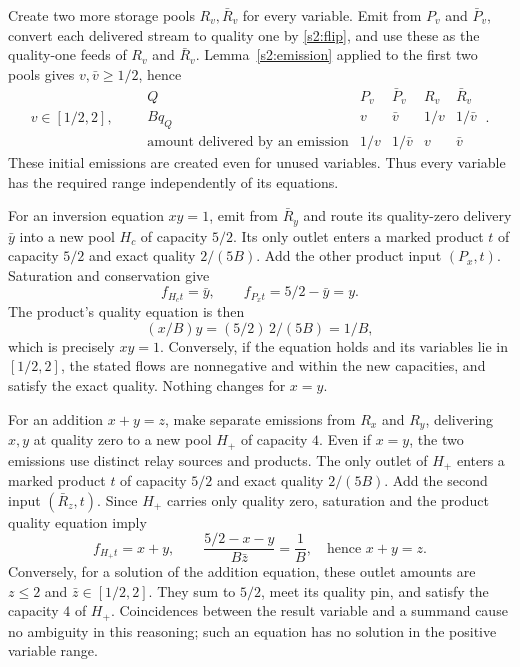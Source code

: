 Create two more storage pools $R_v,\bar R_v$ for every variable.
Emit from $P_v$ and $\bar P_v$, convert each delivered stream to quality
one by \eqref{s2:flip}, and use these as the quality-one feeds of
$R_v$ and $\bar R_v$. Lemma~\ref{s2:emission} applied to the first
two pools gives $v,\bar v\ge1/2$, hence
\begin{equation}
 v\in[1/2,2],\qquad
 \begin{array}{c|cccc}
 Q&P_v&\bar P_v&R_v&\bar R_v\\ \hline
 Bq_Q&v&\bar v&1/v&1/\bar v\\
 \text{amount delivered by an emission}&1/v&1/\bar v&v&\bar v
 \end{array}\ .\label{s2:four-pools}
\end{equation}
These initial emissions are created even for unused variables. Thus
every variable has the required range independently of its equations.

For an inversion equation $xy=1$, emit from $\bar R_y$ and route its
quality-zero delivery $\bar y$ into a new pool $H_c$ of capacity $5/2$.
Its only outlet enters a marked product $t$ of capacity $5/2$ and exact
quality $2/(5B)$. Add the other product input $(P_x,t)$. Saturation
and conservation give
\[
 f_{H_ct}=\bar y,\qquad f_{P_xt}=5/2-\bar y=y.
\]
The product's quality equation is then
\begin{equation}
 (x/B)y=(5/2)\,2/(5B)=1/B,\label{s2:inversion}
\end{equation}
which is precisely $xy=1$. Conversely, if the equation holds and its
variables lie in $[1/2,2]$, the stated flows are nonnegative and within
the new capacities, and satisfy the exact quality. Nothing changes for
$x=y$.

For an addition $x+y=z$, make separate emissions from $R_x$ and $R_y$,
delivering $x,y$ at quality zero to a new pool $H_+$ of capacity $4$.
Even if $x=y$, the two emissions use distinct relay sources and products.
The only outlet of $H_+$ enters a marked product $t$ of capacity $5/2$
and exact quality $2/(5B)$. Add the second input $(\bar R_z,t)$.
Since $H_+$ carries only quality zero, saturation and the product
quality equation imply
\begin{equation}
 f_{H_+t}=x+y,\qquad
 \frac{5/2-x-y}{B\bar z}=\frac1B,
 \quad\text{hence }x+y=z.\label{s2:addition}
\end{equation}
Conversely, for a solution of the addition equation, these outlet amounts
are $z\le2$ and $\bar z\in[1/2,2]$. They sum to $5/2$, meet its
quality pin, and satisfy the capacity $4$ of $H_+$. Coincidences between
the result variable and a summand cause no ambiguity in this reasoning;
such an equation has no solution in the positive variable range.

